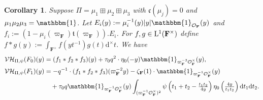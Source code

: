 \documentclass[A4]{amsart}
\newtheorem{corollary}  [theorem]{Corollary}
\numberwithin{equation}{section} \everymath{\displaystyle}
\newcommand{\intL}{{\rm L}}
\newcommand{\id}{\mathbbm{1}}
\newcommand{\ud}{\mathrm{d}}
\newcommand{\F}{\mathbf{F}}
\newcommand{\vO}{\mathcal{O}}
\newcommand{\norm}[1][\cdot]{\lvert #1 \rvert}
\newcommand{\VorH}{\mathcal{VH}}
\newcommand{\Trans}{\mathfrak{t}}
\newcommand{\cond}{\mathfrak{c}}
\begin{document}
\begin{corollary} \label{cor: VHQEleF1Bis}
	Suppose $\Pi = \mu_1 \boxplus \mu_2 \boxplus \mu_3$ with $\cond(\mu_j)=0$ and $\mu_1\mu_2\mu_3 = \id$. Let $E_i(y) := \mu_i^{-1}(y) \norm[y] \id_{\vO_{\F}}(y)$ and $f_i := (1 - \mu_i(\varpi_{\F}) \Trans(\varpi_{\F})).E_i$. For $f,g \in \intL^1(\F^{\times})$ define $f*g(y) := \int_{\F^{\times}} f(yt^{-1})g(t) \ud^{\times} t$.
	We have
\begin{align*} 
	\VorH_{\Pi,\psi}(F_0)(y) &= (f_1*f_2*f_3)(y) + \tau_0 q^2 \cdot \eta_0(-y) \id_{\varpi_{\F}^{-3} \vO_{\F}^{\times}}(y), \\
	\VorH_{\Pi,\psi}(F_1)(y) &= -q^{-1} \cdot (f_1*f_2*f_3)(\varpi_{\F}^{-2}y) - \zeta_{\F}(1) \cdot \id_{\varpi_{\F}^{-1}\vO_{\F}^{\times}}(y) \\
	&\quad + \tau_0 q \id_{\varpi_{\F}^{-1} \vO_{\F}^{\times}}(y) \int_{(\varpi_{\F}^{-1}\vO_{\F}^{\times})^2} \psi \left( t_1+t_2 - \tfrac{t_1t_2}{4y} \right) \eta_0 \left( \tfrac{4y}{t_1t_2} \right) \ud t_1 \ud t_2.
\end{align*}
\end{corollary}
\end{document}
